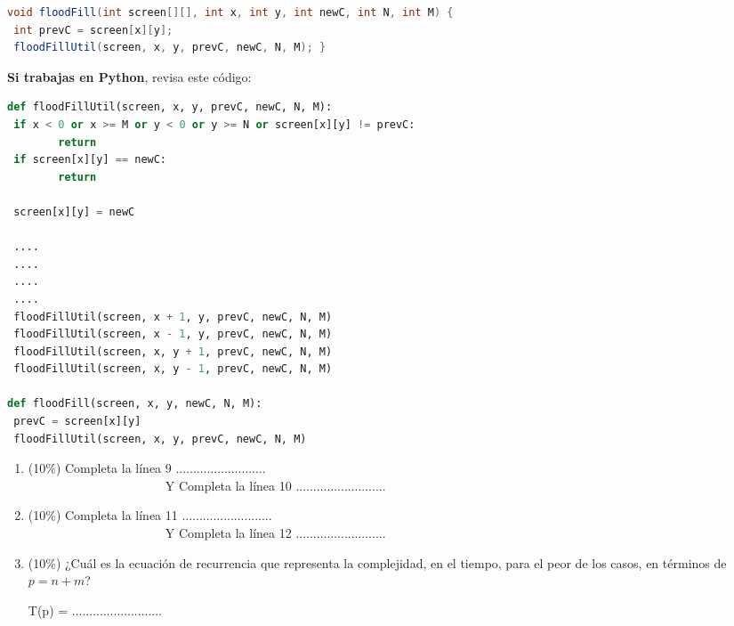 \documentclass[10 pt]{article}
\begin{document}
\begin{multicols}{2}
{\begin{lstlisting}[language=Java]
void floodFill(int screen[][], int x, int y, int newC, int N, int M) { 
 int prevC = screen[x][y]; 
 floodFillUtil(screen, x, y, prevC, newC, N, M); } 
\end{lstlisting}
}


\textbf{Si trabajas en Python}, revisa este código:

{\footnotesize
\begin{lstlisting}[language=Python]
def floodFillUtil(screen, x, y, prevC, newC, N, M): 
 if x < 0 or x >= M or y < 0 or y >= N or screen[x][y] != prevC: 
        return
 if screen[x][y] == newC:
    	return

 screen[x][y] = newC 

 ....
 ....
 ....
 ....
 floodFillUtil(screen, x + 1, y, prevC, newC, N, M) 
 floodFillUtil(screen, x - 1, y, prevC, newC, N, M) 
 floodFillUtil(screen, x, y + 1, prevC, newC, N, M) 
 floodFillUtil(screen, x, y - 1, prevC, newC, N, M) 
  
def floodFill(screen, x, y, newC, N, M): 
 prevC = screen[x][y] 
 floodFillUtil(screen, x, y, prevC, newC, N, M) 
\end{lstlisting}
}

\begin{enumerate}[label=\Alph*]
	\item (10\%) Completa la línea 9 ..........................\\
	\ \ \ \ \ \ \ \ \ \ \ \ \ \ \ \ \ \ \ \ \ \  Y Completa la línea 10 ..........................
	\item (10\%) Completa la línea 11 ..........................\\
	\ \ \ \ \ \ \ \ \ \ \ \ \ \ \ \ \ \ \ \ \ \  Y Completa la línea 12 ..........................
	
	\item (10\%) ¿Cuál es la ecuación de recurrencia que representa la complejidad, en el tiempo, para el peor de los casos, en términos de $p = n + m$?
	
	T(p) = ..........................
\end{enumerate}



\end{multicols}
\end{document}
